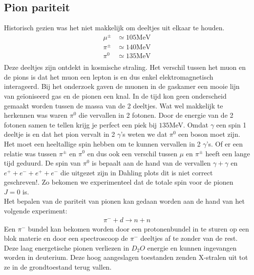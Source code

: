 \documentclass[../main.tex]{subfiles}
\begin{document}
\subsection{Pion pariteit}%
\label{sub:pion_pariteit}

Historisch gezien was het niet makkelijk om deeltjes uit elkaar te houden.
\begin{equation}
    \begin{aligned}
        \label{eq:pion_mass}
        \mu^\pm &\simeq 105 \text{MeV}\\
        \pi^\pm &\simeq 140 \text{MeV}\\
        \pi^0   &\simeq 135 \text{MeV}\\
    \end{aligned}
\end{equation}
Deze deeltjes zijn ontdekt in kosmische straling. Het verschil tussen het muon en de pions is dat het muon een lepton is en dus enkel elektromagnetisch interageerd. Bij het onderzoek gaven de muonen in de gaskamer een mooie lijn van geïoniseerd gas en de pionen een knal. In de tijd kon geen onderscheid gemaakt worden tussen de massa van de 2 deeltjes. Wat wel makkelijk te herkennen was waren $\pi^0$ die vervallen in 2 fotonen. Door de energie van de 2 fotonen samen te tellen krijg je perfect een piek bij $135$MeV. Omdat $\gamma$ een spin 1 deeltje is en dat het pion vervalt in 2 $\gamma$'s weten we dat $\pi^0$ een boson moet zijn. Het moet een heeltallige spin hebben om te kunnen vervallen in 2 $\gamma$'s. Of er een relatie was tussen $\pi^\pm$ en $\pi^0$ en dus ook een verschil tussen $\mu$ en $\pi^\pm$ heeft een lange tijd geduurd. De spin van $\pi^0$ is bepaalt aan de hand van de vervallen $\gamma+\gamma$ en $e^++e^-+e^++e^-$ die uitgezet zijn in Dahling plots {\color{red} dit is niet correct geschreven!}. Zo bekomen we experimenteel dat de totale spin voor de pionen $J=0$ is.\\
Het bepalen van de pariteit van pionen kan gedaan worden aan de hand van het volgende experiment:
\begin{equation}
    \begin{aligned}
        \label{eq:pion_pariteit}
        \pi^- + d \rightarrow n + n
    \end{aligned}
\end{equation}
Een $\pi^-$ bundel kan bekomen worden door een protonenbundel in te sturen op een blok materie en door een spectroscoop de $\pi^-$ deeltjes af te zonder van de rest. Deze laag energetische pionen verliezen in $D_2O$ energie en kunnen ingevangen worden in deuterium. Deze hoog aangeslagen toestanden zenden X-stralen uit tot ze in de grondtoestand terug vallen.
\end{document}
